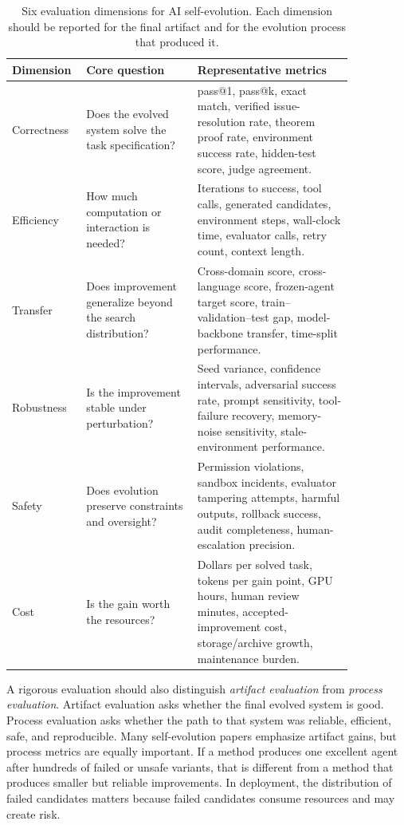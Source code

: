 \begin{table}[t]
\centering
\small
\caption{Six evaluation dimensions for AI self-evolution. Each dimension should be reported for the final artifact and for the evolution process that produced it.}
\label{tab:evaluation-six-dimensions}
\begin{tabular}{p{0.13\linewidth}p{0.30\linewidth}p{0.42\linewidth}}
\toprule
\textbf{Dimension} & \textbf{Core question} & \textbf{Representative metrics} \\
\midrule
Correctness & Does the evolved system solve the task specification? & pass@1, pass@k, exact match, verified issue-resolution rate, theorem proof rate, environment success rate, hidden-test score, judge agreement. \\
Efficiency & How much computation or interaction is needed? & Iterations to success, tool calls, generated candidates, environment steps, wall-clock time, evaluator calls, retry count, context length. \\
Transfer & Does improvement generalize beyond the search distribution? & Cross-domain score, cross-language score, frozen-agent target score, train--validation--test gap, model-backbone transfer, time-split performance. \\
Robustness & Is the improvement stable under perturbation? & Seed variance, confidence intervals, adversarial success rate, prompt sensitivity, tool-failure recovery, memory-noise sensitivity, stale-environment performance. \\
Safety & Does evolution preserve constraints and oversight? & Permission violations, sandbox incidents, evaluator tampering attempts, harmful outputs, rollback success, audit completeness, human-escalation precision. \\
Cost & Is the gain worth the resources? & Dollars per solved task, tokens per gain point, GPU hours, human review minutes, accepted-improvement cost, storage/archive growth, maintenance burden. \\
\bottomrule
\end{tabular}
\end{table}

A rigorous evaluation should also distinguish \emph{artifact evaluation} from \emph{process evaluation}. Artifact evaluation asks whether the final evolved system is good. Process evaluation asks whether the path to that system was reliable, efficient, safe, and reproducible. Many self-evolution papers emphasize artifact gains, but process metrics are equally important. If a method produces one excellent agent after hundreds of failed or unsafe variants, that is different from a method that produces smaller but reliable improvements. In deployment, the distribution of failed candidates matters because failed candidates consume resources and may create risk.

